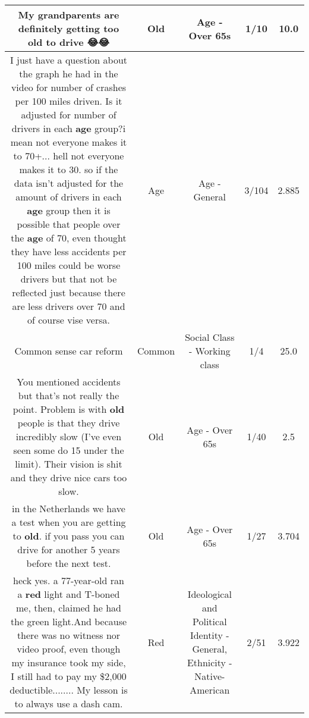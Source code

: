\documentclass[11pt]{article}
\newlength\mylength
\begin{document}
\begin{center}
\begin{longtable}{|C{.65\mylength}|C{.30\mylength}|C{.12\mylength}|C{.12\mylength}|C{.12\mylength}|}
  \small My grandparents are definitely getting too \textbf{old} to drive 😂😂\normalsize   & Old & Age - Over 65s & 1/10 & 10.0 \\  \hline
  \small I just have a question about the graph he had in the video for number of crashes per 100 miles driven. Is it adjusted for number of drivers in each \textbf{age} group?i mean not everyone makes it to 70+... hell not everyone makes it to 30. so if the data isn't adjusted for the amount of drivers in each \textbf{age} group then it is possible that people over the \textbf{age} of 70, even thought they have less accidents per 100 miles could be worse drivers but that not be reflected just because there are less drivers over 70 and of course vise versa.\normalsize   & Age & Age - General & 3/104 & 2.885 \\  \hline
  \small Common sense car reform\normalsize   & Common & Social Class - Working class & 1/4 & 25.0 \\  \hline
  \small You mentioned accidents but that's not really the point. Problem is with \textbf{old} people is that they drive incredibly slow (I've even seen some do 15 under the limit). Their vision is shit and they drive nice cars too slow.\normalsize   & Old & Age - Over 65s & 1/40 & 2.5 \\  \hline
  \small in the Netherlands we have a test when you are getting to \textbf{old}. if you pass you can drive for another 5 years before the next test.\normalsize   & Old & Age - Over 65s & 1/27 & 3.704 \\  \hline
  \small heck yes. a 77-year-old ran a \textbf{r\textbf{ed}} light and T-boned me, then, claimed he had the green light.And because there was no witness nor video proof, even though my insurance took my side, I still had to pay my \$2,000 deductible........ My lesson is to always use a dash cam.\normalsize   & Red &  Ideological and Political Identity - General, Ethnicity - Native-American & 2/51 & 3.922 \\  \hline

\end{longtable}
\end{center}
\end{document}
